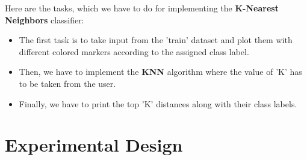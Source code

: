 \documentclass[conference]{IEEEtran}
\begin{document}
Here are the tasks, which we have to do for implementing the \textbf{K-Nearest Neighbors} classifier:
\begin{itemize}  
\item The first task is to take input from the 'train' dataset and plot them with different colored markers according to the assigned class label.
\item Then, we have to implement the \textbf{KNN} algorithm where the value of 'K' has to be taken from the user.
\item Finally, we have to print the top 'K' distances along with their class labels.

\end{itemize}
\section{Experimental Design}
\end{document}

